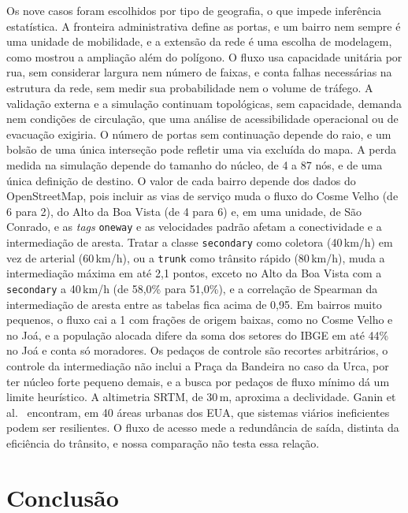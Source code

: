 Os nove casos foram escolhidos por tipo de geografia, o que impede inferência
estatística. A fronteira administrativa define as portas, e um bairro nem
sempre é uma unidade de mobilidade, e a extensão da rede é uma escolha de
modelagem, como mostrou a ampliação além do polígono. O fluxo usa capacidade
unitária por rua, sem considerar largura nem número de faixas, e conta falhas
necessárias na estrutura da rede, sem medir sua probabilidade nem o volume de
tráfego. A validação externa e a simulação continuam topológicas, sem
capacidade, demanda nem condições de circulação, que uma análise de
acessibilidade operacional ou de evacuação exigiria. O número de portas sem
continuação depende do raio, e um bolsão de uma única interseção pode refletir
uma via excluída do mapa. A perda medida na simulação depende do tamanho do
núcleo, de 4 a 87 nós, e de uma única definição de destino. O valor de cada
bairro depende dos dados do OpenStreetMap, pois incluir as vias de serviço muda
o fluxo do Cosme Velho (de 6 para 2), do Alto da Boa Vista (de 4 para 6) e, em
uma unidade, de São Conrado, e as \emph{tags} \texttt{oneway} e as velocidades
padrão afetam a conectividade e a intermediação de aresta. Tratar a classe
\texttt{secondary} como coletora (40\,km/h) em vez de arterial (60\,km/h), ou a
\texttt{trunk} como trânsito rápido (80\,km/h), muda a intermediação máxima em
até 2,1 pontos, exceto no Alto da Boa Vista com a \texttt{secondary} a 40\,km/h
(de 58,0\% para 51,0\%), e a correlação de Spearman da intermediação de aresta
entre as tabelas fica acima de 0,95. Em bairros muito pequenos, o fluxo cai a 1
com frações de origem baixas, como no Cosme Velho e no Joá, e a população
alocada difere da soma dos setores do IBGE em até 44\% no Joá e conta só
moradores. Os pedaços de controle são recortes arbitrários, o controle da
intermediação não inclui a Praça da Bandeira no caso da Urca, por ter núcleo
forte pequeno demais, e a busca por pedaços de fluxo mínimo dá um limite
heurístico. A altimetria SRTM, de 30\,m, aproxima a declividade. Ganin et
al.~\cite{ganin2017resilience} encontram, em 40 áreas urbanas dos EUA, que
sistemas viários ineficientes podem ser resilientes. O fluxo de acesso mede a
redundância de saída, distinta da eficiência do trânsito, e nossa comparação
não testa essa relação.

\FloatBarrier

\section{Conclusão}
\label{sec:conclusion}

